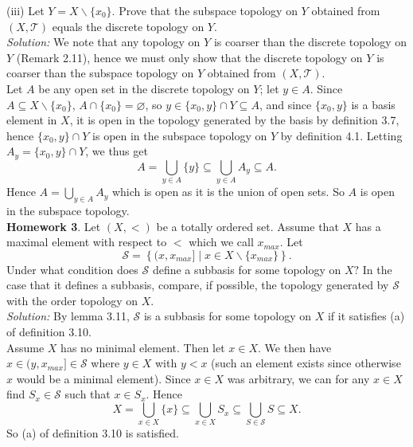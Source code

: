 \documentclass[a4paper]{article}
\begin{document}
\linebreak
(iii) Let $Y = X \backslash \{x_0\}$. Prove that the subspace topology on $Y$
obtained from $(X, \mathcal{T})$ equals the discrete topology on $Y$.\\
\linebreak
\textit{Solution:} We note that any topology on $Y$ is coarser than the
discrete topology on $Y$ (Remark 2.11), hence we must only show that the discrete topology on
$Y$ is coarser than the subspace topology on $Y$ obtained from $(X,
\mathcal{T})$.\\
Let $A$ be any open set in the discrete topology on
$Y$; let $y \in A$. Since $A \subseteq X \backslash \{x_0\}$, $A \cap \{x_0\}
= \varnothing$, so $y \in \{x_0, y\} \cap Y \subseteq A$, and since
$\{x_0, y\}$ is a basis element in $X$, it is open in the topology generated by
the basis by definition 3.7, hence
$\{x_0, y\} \cap Y$ is open in the subspace
topology on $Y$ by definition 4.1. Letting $A_y = \{x_0, y\} \cap Y$, we thus
get
\[
    A = \bigcup_{y \in A} \{y\} \subseteq \bigcup_{y \in A} A_y
    \subseteq A
.\] 
Hence $A = \bigcup_{y \in A} A_y$ which is open as it is the union of open
sets.
So $A$ is open in the subspace topology.\\
\linebreak
\textbf{Homework 3}. Let $(X, <)$ be a totally ordered set. Assume that $X$ has
a maximal element with respect to $<$ which we call $x_{max}$. Let
\[
    \mathcal{S} = \left\{ (x, x_{max}]  \mid x \in X \backslash \{x_{max}\} \right\} 
.\] 
Under what condition does $\mathcal{S}$ define a subbasis for some topology on
$X?$ In the case that it defines a subbasis, compare, if possible, the topology
generated by $\mathcal{S}$ with the order topology on $X$.\\
\linebreak
\textit{Solution:} By lemma 3.11, $\mathcal{S}$ is a subbasis for some topology
on $X$ if it satisfies (a) of definition 3.10.\\
Assume $X$ has no minimal element. Then let $x \in X$. We then have
$x \in (y, x_{max}] \in \mathcal{S}$ where $y \in X$ with $y<x$ (such an
element exists since otherwise $x$ would be a minimal element). Since $x \in X$
was arbitrary, we can for any $x \in X$ find $S_x \in \mathcal{S}$ such that
$x \in S_x$.
Hence
\[
    X = \bigcup_{x \in X} \{x\} \subseteq \bigcup_{x \in X} S_x
    \subseteq \bigcup_{S \in \mathcal{S}} S \subseteq X
.\] 
So (a) of definition 3.10 is satisfied.\\
\linebreak
\end{document}
